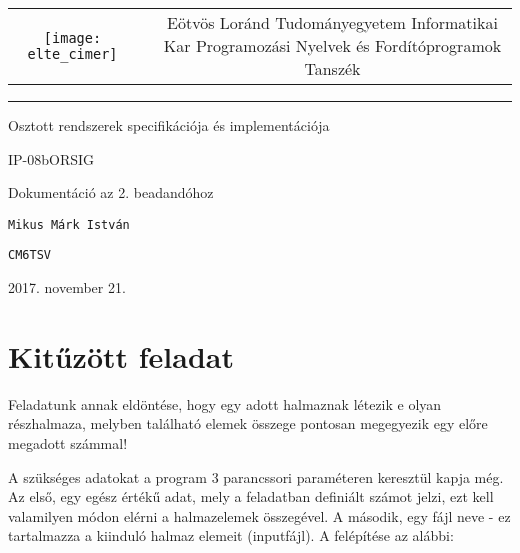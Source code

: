 \documentclass[12pt]{article}
\begin{document}
	
\begin{titlepage}
	\vspace*{0cm}
	\centering
	\begin{tabular}{cp{1cm}c}
		\begin{minipage}{4cm}
			\vspace{0pt}
			\texttt{[image: elte\_cimer]}
		\end{minipage} & &
		\begin{minipage}{7cm}
			\vspace{0pt}Eötvös Loránd Tudományegyetem \vspace{10pt} \newline
			Informatikai Kar \vspace{10pt} \newline
			Programozási Nyelvek és Fordítóprogramok Tanszék
		\end{minipage}
	\end{tabular}
	
	\vspace*{0.2cm}
	\rule{\textwidth}{1pt}
	
	\vspace*{3cm}
	{\Huge Osztott rendszerek specifikációja és implementációja }
	
	\vspace*{0.5cm}
	{\normalsize IP-08bORSIG}
	
	\vspace{2cm}
	{\huge Dokumentáció az 2. beadandóhoz}
	
	\vspace*{5cm}
	
	{\large \verb|Mikus Márk István| } %
	
	{\large \verb|CM6TSV| }  %
		
	
	\vfill
	
	\vspace*{1cm}
	2017. november 21. %
\end{titlepage}

\section{Kitűzött feladat}
Feladatunk annak eldöntése, hogy egy adott halmaznak létezik e olyan részhalmaza, melyben található elemek összege pontosan megegyezik egy előre megadott számmal!

A szükséges adatokat a program 3 parancssori paraméteren keresztül kapja még. Az első, egy egész értékű adat, mely a feladatban definiált számot jelzi, ezt kell valamilyen módon elérni a halmazelemek összegével. A második, egy fájl neve - ez tartalmazza a kiinduló halmaz elemeit (inputfájl). A felépítése az alábbi: 
\end{document}
